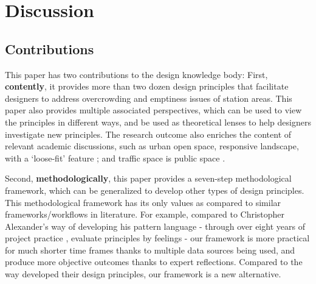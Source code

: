 \documentclass[]{article}
\begin{document}
\section{Discussion}
\label{Discussion}



\subsection{Contributions}
\label{Contribution}

This paper has two contributions to the design knowledge body: First, \textbf{contently}, it provides more than two dozen design principles that facilitate designers to address overcrowding and emptiness issues of station areas. This paper also provides multiple associated perspectives, which can be used to view the principles in different ways, and be used as theoretical lenses to help designers investigate new principles. The research outcome also enriches the content of relevant academic discussions, such as urban open space, responsive landscape, with a ‘loose-fit' feature \citep{thompsonUrbanOpenSpace2002}; and traffic space is public space \citep{bendiksTrafficSpacePublic2020}.

Second, \textbf{methodologically}, this paper provides a seven-step methodological framework, which can be generalized to develop other types of design principles. This methodological framework has its only values as compared to similar frameworks/workflows in literature. For example, compared to Christopher Alexander's way of developing his pattern language - through over eight years of project practice \citep{alexanderPatternLanguageTowns1977}, evaluate principles by feelings - our framework is more practical for much shorter time frames thanks to multiple data sources being used, and produce more objective outcomes thanks to expert reflections. Compared to the way \citet{vanderhoevenSignificanceUndergroundExperience2016} developed their design principles, our framework is a new alternative.

\end{document}
